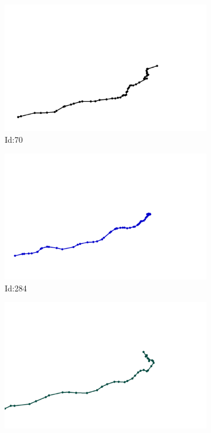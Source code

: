 \documentclass[12pt,twoside]{report}
\begin{document}
\begin{figure}
\centering
\begin{subfigure}[b]{0.20\textwidth}
\centering
\includegraphics[width=\textwidth]{../../trajectories/70.png}
\caption{Id:70}
\end{subfigure}
\begin{subfigure}[b]{0.20\textwidth}
\centering
\includegraphics[width=\textwidth]{../../trajectories/284.png}
\caption{Id:284}
\end{subfigure}
\begin{subfigure}[b]{0.20\textwidth}
\centering
\includegraphics[width=\textwidth]{../../trajectories/353.png}

\end{subfigure}
\end{figure}
\end{document}
